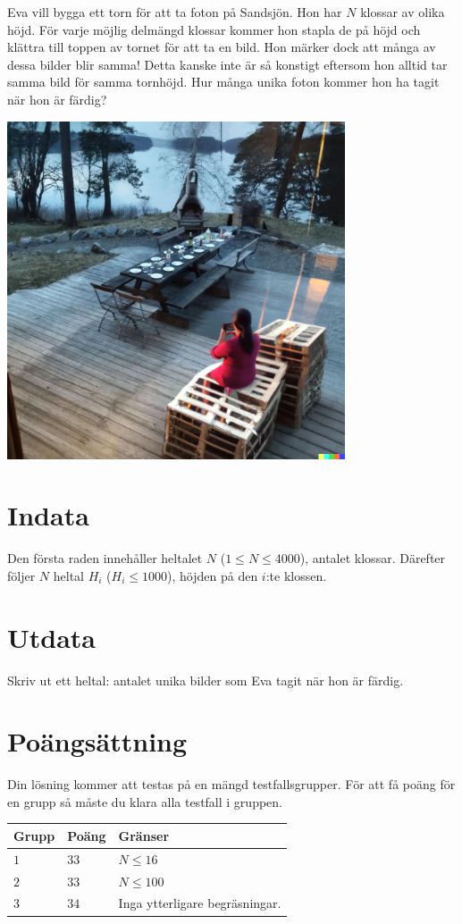 Eva vill bygga ett torn för att ta foton på Sandsjön. Hon har $N$ klossar av olika höjd.
För varje möjlig delmängd klossar kommer hon stapla de på höjd och klättra till toppen av tornet
för att ta en bild. Hon märker dock att många av dessa bilder blir samma! Detta kanske inte är så konstigt eftersom hon alltid tar samma bild för samma tornhöjd. Hur många unika foton kommer hon ha tagit när hon är färdig? 

\includegraphics[width=10cm]{eva.png}

\section*{Indata}
Den första raden innehåller heltalet $N$ ($1 \leq N \leq 4000$), antalet klossar.
Därefter följer $N$ heltal $H_i$ ($H_i \leq 1000$), höjden på den $i$:te klossen.
\section*{Utdata}
Skriv ut ett heltal: antalet unika bilder som Eva tagit när hon är färdig.

\section*{Poängsättning}
Din lösning kommer att testas på en mängd testfallsgrupper.
För att få poäng för en grupp så måste du klara alla testfall i gruppen.

\noindent
\begin{tabular}{| l | l | p{12cm} |}
  \hline
  \textbf{Grupp} & \textbf{Poäng} & \textbf{Gränser} \\ \hline
  $1$    & $33$      & $N \leq 16$ \\ \hline
  $2$    & $33$      & $N \leq 100$ \\ \hline
  $3$    & $34$      & Inga ytterligare begräsningar. \\ \hline
\end{tabular}
